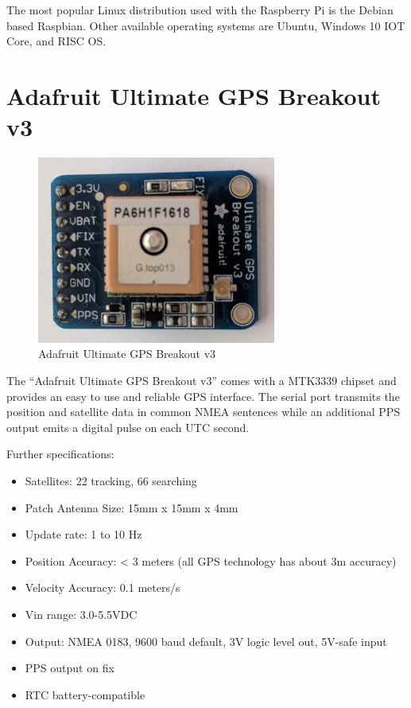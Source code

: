 The most popular Linux distribution used with the Raspberry Pi is the Debian based Raspbian. Other available operating systems are Ubuntu, Windows 10 IOT Core, and RISC OS.

\section{Adafruit Ultimate GPS Breakout v3}

\begin{figure}[tb]
	\centering
	\includegraphics[width=0.7\textwidth]{figures/gps.jpg}
	\caption{Adafruit Ultimate GPS Breakout v3}
	\label{fig:gps}
\end{figure}

The “Adafruit Ultimate GPS Breakout v3” comes with a MTK3339 chipset and provides an easy to use and reliable GPS interface. The serial port transmits the position and satellite data in common NMEA sentences while an additional PPS output emits a digital pulse on each UTC second.

Further specifications:
\begin{itemize}
\item Satellites: 22 tracking, 66 searching
\item Patch Antenna Size: 15mm x 15mm x 4mm
\item Update rate: 1 to 10 Hz
\item Position Accuracy: < 3 meters (all GPS technology has about 3m accuracy)
\item Velocity Accuracy: 0.1 meters/s
\item Vin range: 3.0-5.5VDC
\item Output: NMEA 0183, 9600 baud default, 3V logic level out, 5V-safe input
\item PPS output on fix
\item RTC battery-compatible
\end{itemize}

